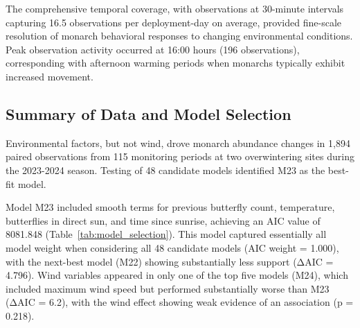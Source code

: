 The comprehensive temporal coverage, with observations at 30-minute intervals capturing 16.5 observations per deployment-day on average, provided fine-scale resolution of monarch behavioral responses to changing environmental conditions. Peak observation activity occurred at 16:00 hours (196 observations), corresponding with afternoon warming periods when monarchs typically exhibit increased movement.

\subsection{Summary of Data and Model Selection}

Environmental factors, but not wind, drove monarch abundance changes in 1,894 paired observations from 115 monitoring periods at two overwintering sites during the 2023-2024 season. Testing of 48 candidate models identified M23 as the best-fit model.

Model M23 included smooth terms for previous butterfly count, temperature, butterflies in direct sun, and time since sunrise, achieving an AIC value of 8081.848 (Table~\ref{tab:model_selection}). This model captured essentially all model weight when considering all 48 candidate models (AIC weight = 1.000), with the next-best model (M22) showing substantially less support (ΔAIC = 4.796). Wind variables appeared in only one of the top five models (M24), which included maximum wind speed but performed substantially worse than M23 (ΔAIC = 6.2), with the wind effect showing weak evidence of an association (p = 0.218).

